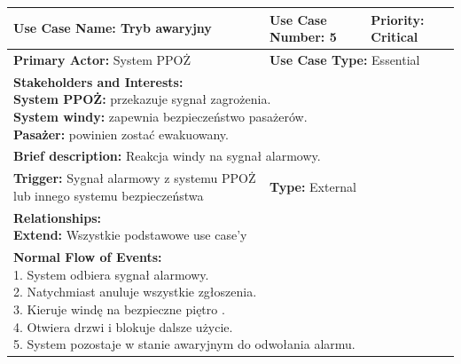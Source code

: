 \documentclass[12pt,a4paper]{article}
\begin{document}
\begin{table}[h!]
\centering
\begin{tabular}{|p{}|p{}|p{}|}
\hline
\textbf{Use Case Name:} Tryb awaryjny & \textbf{Use Case Number:} 5 & \textbf{Priority:} Critical \\ \hline
\textbf{Primary Actor:} System PPOŻ & \multicolumn{2}{l|}{\textbf{Use Case Type:} Essential} \\ \hline
\multicolumn{3}{|p{0.9\textwidth}|}{\textbf{Stakeholders and Interests:} \newline
\textbf{System PPOŻ:} przekazuje sygnał zagrożenia. \newline
\textbf{System windy:} zapewnia bezpieczeństwo pasażerów. \newline
\textbf{Pasażer:} powinien zostać ewakuowany.} \\ \hline
\multicolumn{3}{|p{0.9\textwidth}|}{\textbf{Brief description:} Reakcja windy na sygnał alarmowy.} \\ \hline
\textbf{Trigger:} Sygnał alarmowy z systemu PPOŻ lub innego systemu bezpieczeństwa & \multicolumn{2}{l|}{\textbf{Type:} External} \\ \hline
\multicolumn{3}{|p{0.9\textwidth}|}{\textbf{Relationships:} \newline
\textbf{Extend:} Wszystkie podstawowe use case’y} \\ \hline
\multicolumn{3}{|p{0.9\textwidth}|}{\textbf{Normal Flow of Events:} \newline
1. System odbiera sygnał alarmowy. \newline
2. Natychmiast anuluje wszystkie zgłoszenia. \newline
3. Kieruje windę na bezpieczne piętro . \newline
4. Otwiera drzwi i blokuje dalsze użycie. \newline
5. System pozostaje w stanie awaryjnym do odwołania alarmu.} \\ \hline
\end{tabular}
\end{table}
\end{document}
